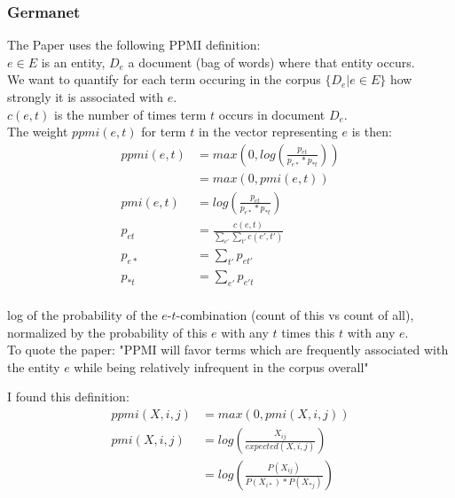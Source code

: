 \documentclass[11pt,
  paper=a4, 
  twoside,  %
  hidelinks,
  bibliography=totocnumbered,
	captions=tableheading,
	BCOR=10mm
]{scrreprt}
\theoremstyle{definition}
\begin{document}
\subsubsection*{Germanet}

\cite{hamp-feldweg-1997-germanet}
\cite{Henrich}

The Paper uses the following PPMI definition:\\ 

\noindent $e \in E$ is an entity, $D_e$ a document (bag of words) where that entity occurs.\\
We want to quantify for each term occuring in the corpus $\{D_e | e \in E\}$ how strongly it is associated with $e$.\\
$c(e,t)$ is the number of times term $t$ occurs in document $D_e$. \\
The weight $ppmi(e,t)$ for term $t$ in the vector representing $e$ is then:
\begin{align*}
ppmi(e,t) &= max\left(0, log\left( \frac{p_{et}}{p_{e*}*p_{*t}} \right) \right) \\
          &= max\left(0, pmi(e,t) \right) \\
 pmi(e,t) &= log\left( \frac{p_{et}}{p_{e*}*p_{*t}} \right) \\          
   p_{et} &= \frac{c(e,t)}{\sum_{e'}\sum_{t'} c(e',t')} \\
   p_{e*} &= \sum_{t'}p_{et'} \\
   p_{*t} &= \sum_{e'}p_{e't} \\
\end{align*}

\noindent log of the probability of the $e$-$t$-combination (count of this vs count of all), normalized by the probability of this $e$ with any $t$ times this $t$ with any $e$.\\
To quote the paper: "PPMI will favor terms which are frequently associated with the entity $e$ while being relatively infrequent in the corpus overall"

\vspace{30px}

I found this definition:
\begin{align*}
ppmi(X,i,j) &= max(0, pmi(X,i,j)) \\
pmi(X,i,j)  &= log\left( \frac{X_{ij}}{expected(X,i,j)} \right) \\
            &= log\left( \frac{P(X_{ij})}{P(X_{i*}) * P(X_{*j})} \right)
\end{align*}


\end{document}
